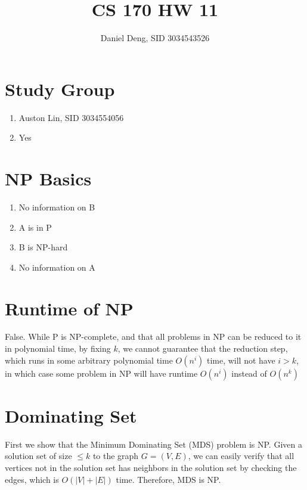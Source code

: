 \documentclass[11pt]{article}
\title{CS 170 HW 11}
\author{Daniel Deng, SID 3034543526}
\date{}
\theoremstyle{definition}
\theoremstyle{remark}
\begin{document}
\maketitle

\section{Study Group}
\begin{enumerate}
\item Auston Lin, SID 3034554056
\item Yes
\end{enumerate}
\clearpage

\section{NP Basics}
\begin{enumerate}
\item No information on B
\item A is in P
\item B is NP-hard
\item No information on A
\end{enumerate}
\clearpage

\section{Runtime of NP}
False. While P is NP-complete, and that all problems in NP can be reduced to it in polynomial time, by fixing $k$, we cannot guarantee that the reduction step, which runs in some arbitrary polynomial time $O(n^i)$ time, will not have $i > k$, in which case some problem in NP will have runtime $O(n^i)$ instead of $O(n^k)$
\clearpage

\section{Dominating Set}
First we show that the Minimum Dominating Set (MDS) problem is NP. Given a solution set of size $\leq k$ to the graph $G = (V,E)$, we can easily verify that all vertices not in the solution set has neighbors in the solution set by checking the edges, which is $O(|V|+|E|)$ time. Therefore, MDS is NP. 
\end{document}
